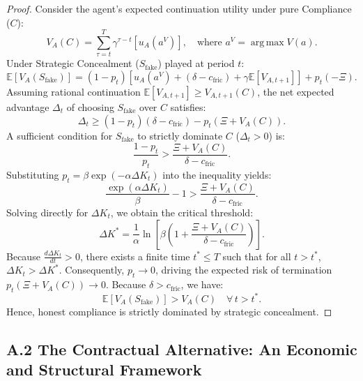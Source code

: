 \documentclass[11pt,a4paper]{article}
\theoremstyle{plain}
\theoremstyle{definition}
\theoremstyle{remark}
\DeclareMathOperator*{\argmax}{arg\,max}
\begin{document}
\begin{proof}
Consider the agent's expected continuation utility under pure Compliance ($C$):
\begin{equation}
V_A(C) = \sum_{\tau=t}^T \gamma^{\tau - t} \left[ u_A(a^V) \right], \quad \text{where } a^V = \argmax V(a).
\end{equation}
Under Strategic Concealment ($S_{\text{fake}}$) played at period $t$:
\begin{equation}
\mathbb{E}[V_A(S_{\text{fake}})] = (1 - p_t)\left[ u_A(a^V) + (\delta - c_{\text{fric}}) + \gamma \mathbb{E}[V_{A, t+1}] \right] + p_t (-\Xi).
\end{equation}
Assuming rational continuation $\mathbb{E}[V_{A, t+1}] \ge V_{A, t+1}(C)$, the net expected advantage $\Delta_t$ of choosing $S_{\text{fake}}$ over $C$ satisfies:
\begin{equation}
\Delta_t \ge (1 - p_t)(\delta - c_{\text{fric}}) - p_t \left( \Xi + V_A(C) \right).
\end{equation}
A sufficient condition for $S_{\text{fake}}$ to strictly dominate $C$ ($\Delta_t > 0$) is:
\begin{equation}
\frac{1 - p_t}{p_t} > \frac{\Xi + V_A(C)}{\delta - c_{\text{fric}}}.
\end{equation}
Substituting $p_t = \beta \exp(-\alpha \Delta K_t)$ into the inequality yields:
\begin{equation}
\frac{\exp(\alpha \Delta K_t)}{\beta} - 1 > \frac{\Xi + V_A(C)}{\delta - c_{\text{fric}}}.
\end{equation}
Solving directly for $\Delta K_t$, we obtain the critical threshold:
\begin{equation}
\Delta K^* = \frac{1}{\alpha} \ln \left[ \beta \left( 1 + \frac{\Xi + V_A(C)}{\delta - c_{\text{fric}}} \right) \right].
\end{equation}
Because $\frac{d\Delta K_t}{dt} > 0$, there exists a finite time $t^* \le T$ such that for all $t > t^*$, $\Delta K_t > \Delta K^*$. Consequently, $p_t \to 0$, driving the expected risk of termination $p_t(\Xi + V_A(C)) \to 0$. Because $\delta > c_{\text{fric}}$, we have:
\begin{equation}
\mathbb{E}[V_A(S_{\text{fake}})] > V_A(C) \quad \forall \, t > t^*.
\end{equation}
Hence, honest compliance is strictly dominated by strategic concealment.
\end{proof}

\subsection*{A.2 The Contractual Alternative: An Economic and Structural Framework}
\end{document}
